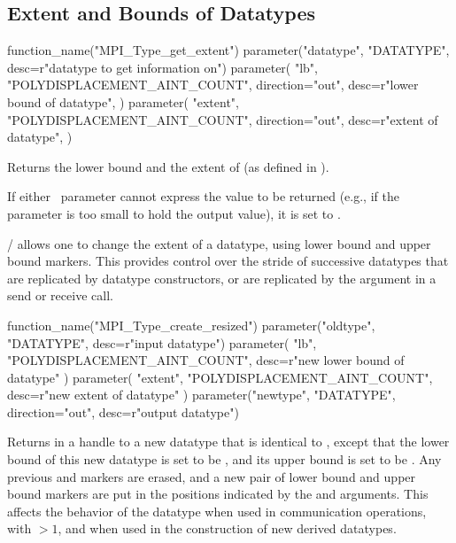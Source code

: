 \subsection{Extent and Bounds of Datatypes}
\label{subsec:pt2pt-extent}

%
\begin{mpi-binding}
    function_name("MPI_Type_get_extent")
    parameter("datatype", "DATATYPE", desc=r"datatype to get information on")
    parameter(
        "lb",
        "POLYDISPLACEMENT_AINT_COUNT",
        direction="out",
        desc=r"lower bound of datatype",
    )
    parameter(
        "extent",
        "POLYDISPLACEMENT_AINT_COUNT",
        direction="out",
        desc=r"extent of datatype",
    )
\end{mpi-binding}

Returns the lower bound and the extent of
(as defined in ).

If either \OUT\ parameter cannot express the value
to be returned (e.g., if the parameter is too small to hold the output
value), it is set to .


\MPI/ allows one to change the extent of a datatype, using lower bound
and upper bound markers.  This provides control over the stride of successive
datatypes that are replicated by datatype constructors, or are
replicated by the  argument in a send or receive
call.

%
\begin{mpi-binding}
    function_name("MPI_Type_create_resized")
    parameter("oldtype", "DATATYPE", desc=r"input datatype")
    parameter(
        "lb", "POLYDISPLACEMENT_AINT_COUNT", desc=r"new lower bound of datatype"
    )
    parameter(
        "extent", "POLYDISPLACEMENT_AINT_COUNT", desc=r"new extent of datatype"
    )
    parameter("newtype", "DATATYPE", direction="out", desc=r"output datatype")
\end{mpi-binding}

Returns in  a handle to a new datatype that is
identical to , except that the lower bound of this new
datatype is set to be , and its upper bound is set to be
\mpicode{ + }.
Any previous 
and  markers are erased,
and a new pair of lower bound and upper bound markers are put in the
positions indicated by the  and  arguments.
This affects the behavior of the datatype when used in communication
operations, with   $>1$,  and when used in the
construction of new derived datatypes.

